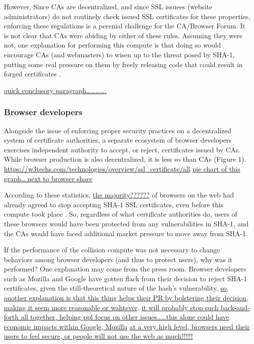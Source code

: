 \documentclass[sigconf]{acmart}
\begin{document}
However, Since CAs are decentralized, and since SSL issuees (website administrators) do not routinely check issued SSL certificates for these properties, enforcing these regulations is a perenial challenge for the CA/Browser Forum. It is not clear that CAs were abiding by either of these rules.
Assuming they were not, one explanation for performing this compute is that doing so would encourage CAs (and webmasters) to wisen up to the threat posed by SHA-1,
putting some real pressure on them by freely releasing code that could result in forged certificates \cite{Stevens2017github}.

\uline{quick conclusory paragraph\ldots{}\ldots{}\ldots{}\ldots{}.}

\subsubsection{Browser developers}
\label{sec:orgce90532}

Alongside the issue of enforcing proper security practices on a decentralized system of certificate authorities, 
a separate ecosystem of browser developers exercises independent authority to accept, or reject, certificates issued by CAs.
While browser production is also decentralized, it is less so than CAs (Figure 1).
\url{https://w3techs.com/technologies/overview/ssl\_certificate/all} \uline{pie chart of this graph\ldots{}.next to browser share}

According to these statistics, \uline{the majority??????} of browsers on the web had already agreed to stop accepting SHA-1 SSL certificates,
even before this compute took place
\cite{Sleevi2014,Mozilla2017}.
So, regardless of what certificate authorities do, users of these browsers would have been protected from any vulnerabilities in SHA-1, 
and the CAs would have faced additional market pressure to move away from SHA-1.

If the performance of the collision compute was not necessary to change behaviors among browser developers
(and thus to protect users),
why was it performed?
One explanation may come from the press room.
Browser developers such as Mozilla and Google have gotten flack from their decision to reject SHA-1 certificates,
given the still-theoretical nature of the hash's vulnerability.
\uline{so, another explanation is that this thing helps their PR by bolstering their decision, making it seem more reasonable or wahtever}.
\uline{it will probably stop such back-and-forth all together, helping ppl focus on other issues\ldots{}\ldots{}this alone could have economic impacts within Google, Mozilla}
\uline{at a very high level, browsers need their users to feel secure, or people will not use the web as much!!!!!!}
\end{document}
